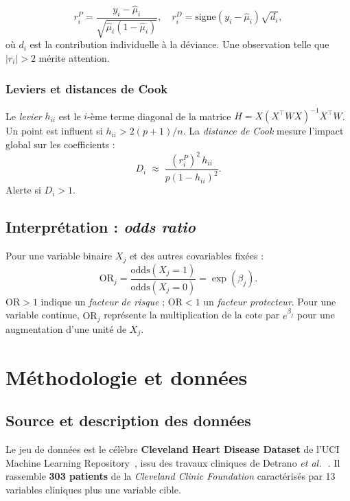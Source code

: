 \documentclass[11pt,a4paper,twoside]{report}
\newcommand{\OR}{\mathrm{OR}}
\theoremstyle{definition}
\begin{document}
\begin{equation}
  r_i^P = \frac{y_i - \hat\mu_i}{\sqrt{\hat\mu_i(1-\hat\mu_i)}},
  \quad
  r_i^D = \mathrm{signe}(y_i - \hat\mu_i)\sqrt{d_i},
\end{equation}
où $d_i$ est la contribution individuelle à la déviance. Une
observation telle que $|r_i| > 2$ mérite attention.

\subsection{Leviers et distances de Cook}

Le \emph{levier} $h_{ii}$ est le $i$-ème terme diagonal de la matrice
$H = X(X^\top W X)^{-1}X^\top W$. Un point est influent si
$h_{ii} > 2(p+1)/n$. La \emph{distance de Cook} mesure l'impact global
sur les coefficients :
\begin{equation}
  D_i \;\approx\; \frac{(r_i^P)^2\,h_{ii}}{p(1-h_{ii})^2}.
\end{equation}
Alerte si $D_i > 1$.

\section{Interprétation : \emph{odds ratio}}

Pour une variable binaire $X_j$ et des autres covariables fixées :
\begin{equation}
  \OR_j = \frac{\mathrm{odds}(X_j = 1)}{\mathrm{odds}(X_j = 0)}
        = \exp(\beta_j).
\end{equation}
$\OR > 1$ indique un \emph{facteur de risque} ; $\OR < 1$ un
\emph{facteur protecteur}. Pour une variable continue, $\OR_j$
représente la multiplication de la cote par $e^{\beta_j}$ pour une
augmentation d'une unité de $X_j$.

\chapter{Méthodologie et données}

\section{Source et description des données}

Le jeu de données est le célèbre \textbf{Cleveland Heart Disease
Dataset} de l'UCI Machine Learning Repository~\cite{uci}, issu des
travaux cliniques de Detrano \textit{et al.}\,~\cite{detrano}. Il
rassemble \textbf{303 patients} de la \emph{Cleveland Clinic Foundation}
caractérisés par 13 variables cliniques plus une variable cible.
\end{document}
